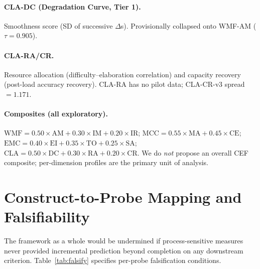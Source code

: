 \documentclass{article}
\begin{document}
\paragraph{CLA-DC (Degradation Curve, Tier 1).}
Smoothness score (SD of successive $\Delta$s). Provisionally collapsed
onto WMF-AM ($\tau = 0.905$).

\paragraph{CLA-RA/CR.}
Resource allocation (difficulty--elaboration correlation) and capacity
recovery (post-load accuracy recovery). CLA-RA has no pilot data;
CLA-CR-v3 spread $= 1.171$.

\paragraph{Composites (all exploratory).}
$\text{WMF} = 0.50 \times \text{AM} + 0.30 \times \text{IM} + 0.20 \times \text{IR}$;
$\text{MCC} = 0.55 \times \text{MA} + 0.45 \times \text{CE}$;
$\text{EMC} = 0.40 \times \text{EI} + 0.35 \times \text{TO} + 0.25 \times \text{SA}$;
$\text{CLA} = 0.50 \times \text{DC} + 0.30 \times \text{RA} + 0.20 \times \text{CR}$.
We do \emph{not} propose an overall CEF composite; per-dimension profiles
are the primary unit of analysis.

\section{Construct-to-Probe Mapping and Falsifiability}
\label{app:falsify}

The framework as a whole would be undermined if process-sensitive
measures never provided incremental prediction beyond completion
on any downstream criterion.
Table~\ref{tab:falsify} specifies per-probe falsification conditions.
\end{document}
